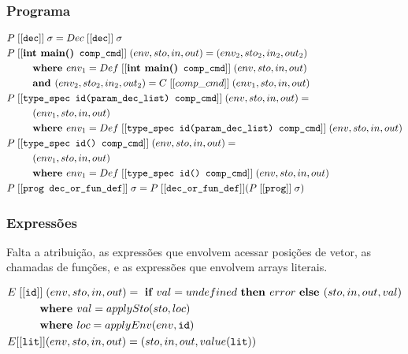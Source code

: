 \documentclass[12pt]{article}
\newcommand\eb[1]{[[\texttt{#1}]]}
\begin{document}
\subsubsection{Programa}

\begin{align*}
&P\;\eb{dec} \;\sigma = Dec\;\eb{dec} \;\sigma \\
&P\;\eb{{\bf int main()} comp\_cmd} \;(env,sto,in,out) =
(env_2, sto_2, in_2, out_2) \\
	&\hspace{6ex}\textbf{where } env_1 = Def\;\eb{{\bf int main()} comp\_cmd} \;(env,sto,in,out) \\
	&\hspace{6ex}\textbf{and } (env_2,sto_2,in_2,out_2) = C\;[[comp\_cmd]] \;(env_1,sto,in,out) \\
&P\;\eb{type\_spec id(param\_dec\_list) comp\_cmd} \;(env,sto,in,out) = \\
&\hspace{6ex}(env_1, sto, in, out) \\
	&\hspace{6ex}\textbf{where } env_1 = Def\;\eb{type\_spec id(param\_dec\_list) comp\_cmd} \;(env,sto,in,out)\\
&P\;\eb{type\_spec id() comp\_cmd} \;(env,sto,in,out) = \\
&\hspace{6ex}(env_1, sto, in, out) \\
	&\hspace{6ex}\textbf{where } env_1 = Def\;\eb{type\_spec id() comp\_cmd} \;(env,sto,in,out)\\
&P\;\eb{prog dec\_or\_fun\_def} \;\sigma = P\;\eb{dec\_or\_fun\_def} (P\;\eb{prog} \;\sigma)
\end{align*}

\subsubsection{Expressões}

{\large \color{red} Falta a atribuição, as expressões que envolvem acessar posições de vetor, as chamadas de funções, e as expressões que envolvem arrays literais.}


\begin{align*}
&E\;\eb{id} \;(env, sto, in, out) = \text{ \bf if } val = undefined \text{ \bf then } error \text{ \bf else } (sto,in,out,val)  \\ 
&\hspace{6ex} \textbf{ where } val = applySto(sto, loc) \\
&\hspace{6ex} \textbf{ where } loc = applyEnv(env, \texttt{id}) \\
&E[[{\tt lit}]] (env,sto,in,out) = (sto,in,out,value(\texttt{lit})) \\
\end{align*}
\end{document}
